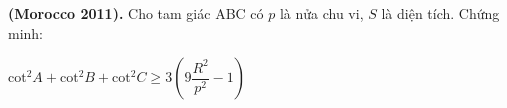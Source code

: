 \documentclass[12pt,a4paper]{article}
\begin{document}
	\textbf{(Morocco 2011).} Cho tam giác ABC có $p$ là nửa chu vi, $S$ là diện tích. Chứng minh:
\begin{center}
		${\mathrm{cot}}^{2}A+{\mathrm{cot}}^{2}B+{\mathrm{cot}}^{2}C\ge 3\left(9\dfrac{{R}^{2}}{{p}^{2}}-1\right)$
\end{center}
\end{document}
